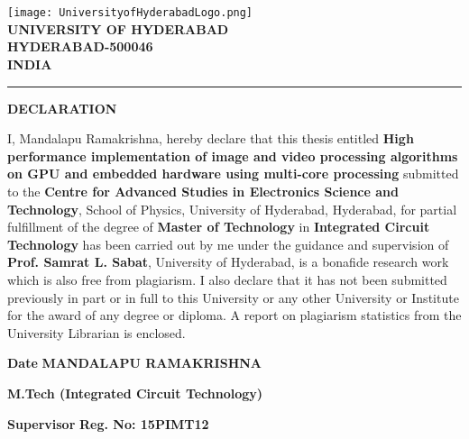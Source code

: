
\chapter*{}
\vspace{-5cm}
{\centering
\texttt{[image: UniversityofHyderabadLogo.png]}\\
\textbf{UNIVERSITY OF HYDERABAD}\\
\textbf{HYDERABAD-500046}\\
\textbf{INDIA}\\
\rule{\textwidth}{2pt}
\begin{center}
	\textbf{DECLARATION}
\end{center}}
I, Mandalapu Ramakrishna, hereby declare that this thesis entitled \textbf{High performance implementation of image and video processing algorithms on GPU and embedded hardware using multi-core processing} submitted to the \textbf{Centre for Advanced Studies in Electronics Science and Technology}, School of Physics, University of Hyderabad, Hyderabad, for partial fulfillment of the degree of \textbf{Master of Technology} in \textbf{Integrated Circuit Technology} has been carried out by me under the guidance and supervision of \textbf{Prof. Samrat L. Sabat}, University of Hyderabad, is a bonafide research work which is also free from plagiarism. I also declare that it has not been submitted previously in part or in full to this University or any other University or Institute for the award of any degree or diploma. A report on plagiarism statistics from the University Librarian is enclosed. \\

\vspace{3.0cm}
\par
\textbf{Date }        \hspace{3.4cm}  \textbf{MANDALAPU RAMAKRISHNA}\par
                \hspace{4.7cm}  \textbf{M.Tech (Integrated Circuit Technology)}\par
\textbf{Supervisor}    \hspace{2.4cm}  \textbf{Reg. No: 15PIMT12}\par


